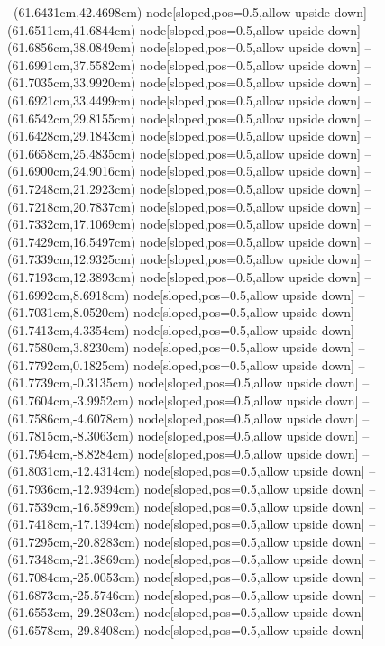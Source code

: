 --(61.6431cm,42.4698cm) node[sloped,pos=0.5,allow upside down]{\ArrowIn}
--(61.6511cm,41.6844cm) node[sloped,pos=0.5,allow upside down]{\arrowIn}
--(61.6856cm,38.0849cm) node[sloped,pos=0.5,allow upside down]{\ArrowIn}
--(61.6991cm,37.5582cm) node[sloped,pos=0.5,allow upside down]{\arrowIn}
--(61.7035cm,33.9920cm) node[sloped,pos=0.5,allow upside down]{\ArrowIn}
--(61.6921cm,33.4499cm) node[sloped,pos=0.5,allow upside down]{\arrowIn}
--(61.6542cm,29.8155cm) node[sloped,pos=0.5,allow upside down]{\ArrowIn}
--(61.6428cm,29.1843cm) node[sloped,pos=0.5,allow upside down]{\arrowIn}
--(61.6658cm,25.4835cm) node[sloped,pos=0.5,allow upside down]{\ArrowIn}
--(61.6900cm,24.9016cm) node[sloped,pos=0.5,allow upside down]{\arrowIn}
--(61.7248cm,21.2923cm) node[sloped,pos=0.5,allow upside down]{\ArrowIn}
--(61.7218cm,20.7837cm) node[sloped,pos=0.5,allow upside down]{\arrowIn}
--(61.7332cm,17.1069cm) node[sloped,pos=0.5,allow upside down]{\ArrowIn}
--(61.7429cm,16.5497cm) node[sloped,pos=0.5,allow upside down]{\arrowIn}
--(61.7339cm,12.9325cm) node[sloped,pos=0.5,allow upside down]{\ArrowIn}
--(61.7193cm,12.3893cm) node[sloped,pos=0.5,allow upside down]{\arrowIn}
--(61.6992cm,8.6918cm) node[sloped,pos=0.5,allow upside down]{\ArrowIn}
--(61.7031cm,8.0520cm) node[sloped,pos=0.5,allow upside down]{\arrowIn}
--(61.7413cm,4.3354cm) node[sloped,pos=0.5,allow upside down]{\ArrowIn}
--(61.7580cm,3.8230cm) node[sloped,pos=0.5,allow upside down]{\arrowIn}
--(61.7792cm,0.1825cm) node[sloped,pos=0.5,allow upside down]{\ArrowIn}
--(61.7739cm,-0.3135cm) node[sloped,pos=0.5,allow upside down]{\arrowIn}
--(61.7604cm,-3.9952cm) node[sloped,pos=0.5,allow upside down]{\ArrowIn}
--(61.7586cm,-4.6078cm) node[sloped,pos=0.5,allow upside down]{\arrowIn}
--(61.7815cm,-8.3063cm) node[sloped,pos=0.5,allow upside down]{\ArrowIn}
--(61.7954cm,-8.8284cm) node[sloped,pos=0.5,allow upside down]{\arrowIn}
--(61.8031cm,-12.4314cm) node[sloped,pos=0.5,allow upside down]{\ArrowIn}
--(61.7936cm,-12.9394cm) node[sloped,pos=0.5,allow upside down]{\arrowIn}
--(61.7539cm,-16.5899cm) node[sloped,pos=0.5,allow upside down]{\ArrowIn}
--(61.7418cm,-17.1394cm) node[sloped,pos=0.5,allow upside down]{\arrowIn}
--(61.7295cm,-20.8283cm) node[sloped,pos=0.5,allow upside down]{\ArrowIn}
--(61.7348cm,-21.3869cm) node[sloped,pos=0.5,allow upside down]{\arrowIn}
--(61.7084cm,-25.0053cm) node[sloped,pos=0.5,allow upside down]{\ArrowIn}
--(61.6873cm,-25.5746cm) node[sloped,pos=0.5,allow upside down]{\arrowIn}
--(61.6553cm,-29.2803cm) node[sloped,pos=0.5,allow upside down]{\ArrowIn}
--(61.6578cm,-29.8408cm) node[sloped,pos=0.5,allow upside down]{\arrowIn}
